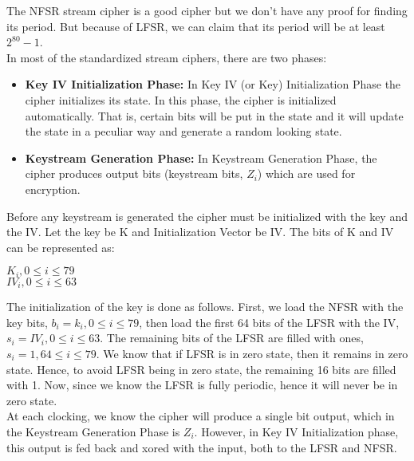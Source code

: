 \documentclass[11pt]{article}
\newcounter{subsubsubsection}[subsubsection]
\begin{document}
\newline
The NFSR stream cipher is a good cipher but we don't have any proof for finding its period. But because of LFSR, we can claim that its period will be at least $2^{80} - 1$.\\
\newline
In most of the standardized stream ciphers, there are two phases:
\begin{itemize}
    \item \textbf{Key IV Initialization Phase:} In Key IV (or Key) Initialization Phase the cipher initializes its state. In this phase, the cipher is initialized automatically. That is, certain bits will be put in the state and it will update the state in a peculiar way and generate a random looking state.
    \item \textbf{Keystream Generation Phase:} In Keystream Generation Phase, the cipher produces output bits (keystream bits, $Z_i$) which are used for encryption. 
\end{itemize}

Before any keystream is generated the cipher must be initialized with the key and the IV. Let the key be K and Initialization Vector be IV. The bits of K and IV can be represented as:
\begin{center}
    $K_i, 0 \leq i \leq 79$\\
    $IV_i, 0 \leq i \leq 63$
\end{center}
The initialization of the key is done as follows. First, we load the NFSR with the key bits, $b_i = k_i, 0 \leq i \leq 79$, then load the first 64 bits of the LFSR with the IV, $s_i = IV_i, 0 \leq i \leq 63$. The remaining bits of the LFSR are filled with ones, $s_i = 1, 64 \leq i \leq 79$. We know that if LFSR is in zero state, then it remains in zero state. Hence, to avoid LFSR being in zero state, the remaining 16 bits are filled with 1. Now, since we know the LFSR is fully periodic, hence it will never be in zero state.\\
\newline
At each clocking, we know the cipher will produce a single bit output, which in the Keystream Generation Phase is $Z_i$. However, in Key IV Initialization phase, this output is fed back and xored with the input, both to the LFSR and NFSR.
\end{document}
